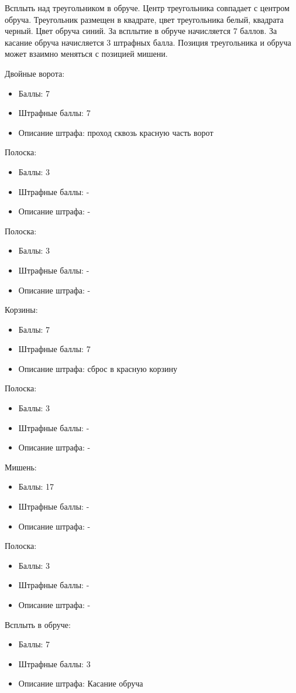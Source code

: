 
Всплыть над треугольником в обруче. Центр треугольника совпадает с центром обруча. Треугольник размещен в квадрате, цвет треугольника белый, квадрата черный. Цвет обруча синий. За всплытие в обруче начисляется 7 баллов. За касание обруча начисляется 3 штрафных балла. Позиция  треугольника и обруча может взаимно меняться с позицией мишени.

\markSection

Двойные ворота: 
\begin{itemize}
    \item Баллы: 7
    \item Штрафные баллы: 7
    \item Описание штрафа: проход сквозь красную часть ворот
\end{itemize}

Полоска:
\begin{itemize}
    \item Баллы: 3
    \item Штрафные баллы: -
    \item Описание штрафа: -
\end{itemize}

Полоска: 
\begin{itemize}
    \item Баллы: 3
    \item Штрафные баллы: -
    \item Описание штрафа: -
\end{itemize}

Корзины:
\begin{itemize}
    \item Баллы: 7
    \item Штрафные баллы: 7
    \item Описание штрафа: сброс в красную корзину
\end{itemize}

Полоска:
\begin{itemize}
    \item Баллы: 3
    \item Штрафные баллы: -
    \item Описание штрафа: -
\end{itemize}

Мишень:
\begin{itemize}
    \item Баллы: 17
    \item Штрафные баллы: -
    \item Описание штрафа: -
\end{itemize}

Полоска:
\begin{itemize}
    \item Баллы: 3
    \item Штрафные баллы: -
    \item Описание штрафа: -
\end{itemize}

Всплыть в обруче:
\begin{itemize}
    \item Баллы: 7
    \item Штрафные баллы: 3
    \item Описание штрафа: Касание обруча
\end{itemize}